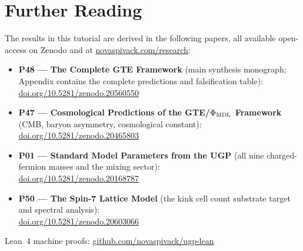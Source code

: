 \documentclass[11pt,a4paper]{article}
\begin{document}
\section*{Further Reading}
\begin{tcolorbox}[colback=orange!8,colframe=orange!50!black,
  title=\textbf{Primary Sources}]
The results in this tutorial are derived in the following papers,
all available open-access on Zenodo and at
\href{https://novaspivack.com/research}{novaspivack.com/research}:
\begin{itemize}[itemsep=2pt]
  \item \textbf{P48 --- The Complete GTE Framework} (main synthesis monograph;
    Appendix contains the complete predictions and falsification table):\\
        \href{https://doi.org/10.5281/zenodo.20560550}{doi.org/10.5281/zenodo.20560550}
  \item \textbf{P47 --- Cosmological Predictions of the GTE/$\Phi_{\rm MDL}$ Framework}
        (CMB, baryon asymmetry, cosmological constant):\\
        \href{https://doi.org/10.5281/zenodo.20465803}{doi.org/10.5281/zenodo.20465803}
  \item \textbf{P01 --- Standard Model Parameters from the UGP}
        (all nine charged-fermion masses and the mixing sector):\\
        \href{https://doi.org/10.5281/zenodo.20168787}{doi.org/10.5281/zenodo.20168787}
  \item \textbf{P50 --- The Spin-7 Lattice Model}
        (the kink cell count substrate target and spectral analysis):\\
        \href{https://doi.org/10.5281/zenodo.20603066}{doi.org/10.5281/zenodo.20603066}
\end{itemize}
Lean~4 machine proofs:
\href{https://github.com/novaspivack/ugp-lean}{github.com/novaspivack/ugp-lean}
\end{tcolorbox}


\end{document}
